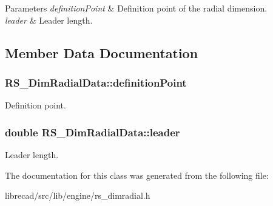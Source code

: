 \begin{DoxyParams}{Parameters}
{\em definition\-Point} & Definition point of the radial dimension. \\
\hline
{\em leader} & Leader length. \\
\hline
\end{DoxyParams}


\subsection{Member Data Documentation}
\hypertarget{classRS__DimRadialData_aeac3a16cfcdc676e7cc644f8412ffe3d}{
\subsubsection[{definition\-Point}]{ R\-S\-\_\-\-Dim\-Radial\-Data\-::definition\-Point}}\label{classRS__DimRadialData_aeac3a16cfcdc676e7cc644f8412ffe3d}
Definition point. \hypertarget{classRS__DimRadialData_abdc0c64e6901c22c4788100b0485e020}{
\subsubsection[{leader}]{\setlength{\rightskip}{0pt plus 5cm}double R\-S\-\_\-\-Dim\-Radial\-Data\-::leader}}\label{classRS__DimRadialData_abdc0c64e6901c22c4788100b0485e020}
Leader length. 

The documentation for this class was generated from the following file\-:\begin{DoxyCompactItemize}
\item 
librecad/src/lib/engine/rs\-\_\-dimradial.\-h\end{DoxyCompactItemize}
